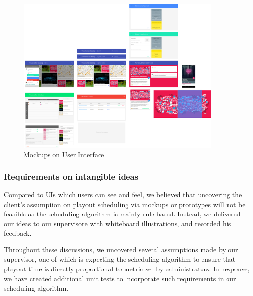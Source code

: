 \documentclass[a4paper, titlepage]{article}
\begin{document}
\begin{figure}[ht]
   \begin{center}
      \includegraphics[width = 0.9\textwidth, trim = 0 0 0 0cm, clip]{./eval/mockup.png}
   \end{center}
   \caption{Mockups on User Interface}
   \label{fig:eval_mockup}
\end{figure}

\subsubsection{Requirements on intangible ideas}

Compared to UIs which users can see and feel, we believed that uncovering the client's assumption on playout scheduling via mockups or prototypes will not be feasible as the scheduling algorithm is mainly rule-based. Instead, we delivered our ideas to our supervisore with whiteboard illustrations, and recorded his feedback.

Throughout these discussions, we uncovered several assumptions made by our supervisor, one of which is expecting the scheduling algorithm to ensure that playout time is directly proportional to metric set by administrators. In response, we have created additional unit tests to incorporate such requirements in our scheduling algorithm.
\end{document}
